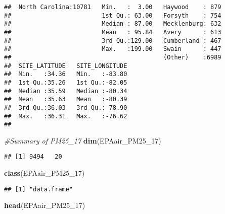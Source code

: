 \documentclass[]{article}
\newenvironment{Shaded}{\begin{snugshade}}{\end{snugshade}}
\newcommand{\KeywordTok}[1]{\textcolor[rgb]{0.13,0.29,0.53}{\textbf{#1}}}
\newcommand{\DecValTok}[1]{\textcolor[rgb]{0.00,0.00,0.81}{#1}}
\newcommand{\CommentTok}[1]{\textcolor[rgb]{0.56,0.35,0.01}{\textit{#1}}}
\newcommand{\NormalTok}[1]{#1}
\begin{document}
\begin{verbatim}
##  North Carolina:10781   Min.   :  3.00   Haywood    : 879  
##                         1st Qu.: 63.00   Forsyth    : 754  
##                         Median : 87.00   Mecklenburg: 632  
##                         Mean   : 95.84   Avery      : 613  
##                         3rd Qu.:129.00   Cumberland : 467  
##                         Max.   :199.00   Swain      : 447  
##                                          (Other)    :6989  
##  SITE_LATITUDE   SITE_LONGITUDE  
##  Min.   :34.36   Min.   :-83.80  
##  1st Qu.:35.26   1st Qu.:-82.05  
##  Median :35.59   Median :-80.34  
##  Mean   :35.63   Mean   :-80.39  
##  3rd Qu.:36.03   3rd Qu.:-78.90  
##  Max.   :36.31   Max.   :-76.62  
## 
\end{verbatim}

\begin{Shaded}
\begin{Highlighting}[]
\CommentTok{#Summary of PM25_17}
\KeywordTok{dim}\NormalTok{(EPAair_PM25_}\DecValTok{17}\NormalTok{)}
\end{Highlighting}
\end{Shaded}

\begin{verbatim}
## [1] 9494   20
\end{verbatim}

\begin{Shaded}
\begin{Highlighting}[]
\KeywordTok{class}\NormalTok{(EPAair_PM25_}\DecValTok{17}\NormalTok{)}
\end{Highlighting}
\end{Shaded}

\begin{verbatim}
## [1] "data.frame"
\end{verbatim}

\begin{Shaded}
\begin{Highlighting}[]
\KeywordTok{head}\NormalTok{(EPAair_PM25_}\DecValTok{17}\NormalTok{)}
\end{Highlighting}
\end{Shaded}
\end{document}

